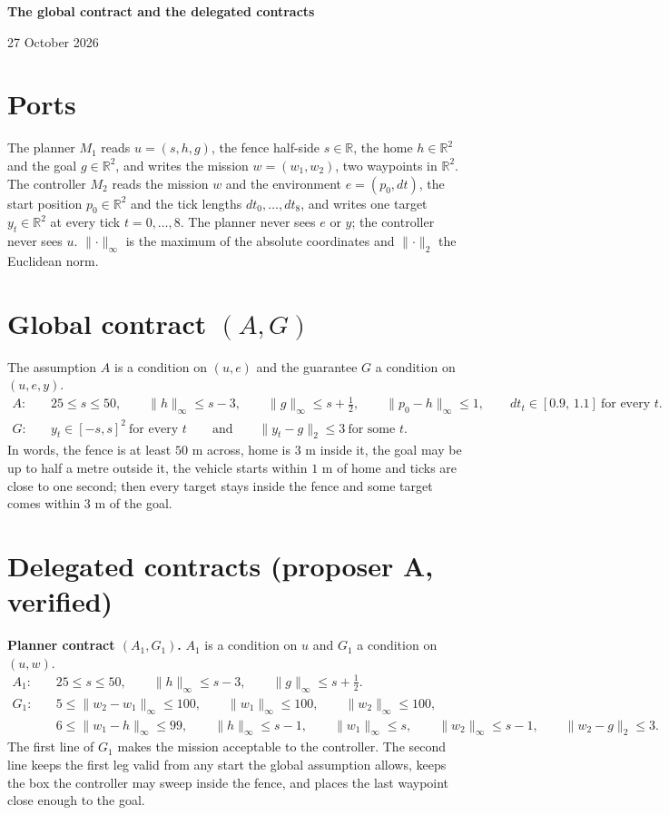 \documentclass[10pt]{article}
\newcommand{\ninf}[1]{\lVert #1\rVert_\infty}
\newcommand{\ntwo}[1]{\lVert #1\rVert_2}
\begin{document}
{\Large\bfseries The global contract and the delegated contracts}\par 27 October 2026

\section*{Ports}
The planner $M_1$ reads $u=(s,h,g)$, the fence half-side $s\in\mathbb R$, the home $h\in\mathbb R^2$ and the goal $g\in\mathbb R^2$, and writes the mission $w=(w_1,w_2)$, two waypoints in $\mathbb R^2$. The controller $M_2$ reads the mission $w$ and the environment $e=(p_0,dt)$, the start position $p_0\in\mathbb R^2$ and the tick lengths $dt_0,\dots,dt_8$, and writes one target $y_t\in\mathbb R^2$ at every tick $t=0,\dots,8$. The planner never sees $e$ or $y$; the controller never sees $u$. $\ninf{\cdot}$ is the maximum of the absolute coordinates and $\ntwo{\cdot}$ the Euclidean norm.

\section*{Global contract $(A,G)$}
The assumption $A$ is a condition on $(u,e)$ and the guarantee $G$ a condition on $(u,e,y)$.
\begin{align*}
A:\quad& 25\le s\le 50,\qquad \ninf{h}\le s-3,\qquad \ninf{g}\le s+\tfrac12,\qquad \ninf{p_0-h}\le 1,\qquad dt_t\in[0.9,\,1.1]\ \text{for every } t.\\
G:\quad& y_t\in[-s,s]^2\ \text{for every } t\qquad\text{and}\qquad \ntwo{y_t-g}\le 3\ \text{for some } t.
\end{align*}
In words, the fence is at least $50$ m across, home is $3$ m inside it, the goal may be up to half a metre outside it, the vehicle starts within $1$ m of home and ticks are close to one second; then every target stays inside the fence and some target comes within $3$ m of the goal.

\section*{Delegated contracts (proposer A, verified)}
\textbf{Planner contract $(A_1,G_1)$.} $A_1$ is a condition on $u$ and $G_1$ a condition on $(u,w)$.
\begin{align*}
A_1:\quad& 25\le s\le 50,\qquad \ninf{h}\le s-3,\qquad \ninf{g}\le s+\tfrac12.\\
G_1:\quad& 5\le\ninf{w_2-w_1}\le 100,\qquad \ninf{w_1}\le 100,\qquad \ninf{w_2}\le 100,\\
& 6\le\ninf{w_1-h}\le 99,\qquad \ninf{h}\le s-1,\qquad \ninf{w_1}\le s,\qquad \ninf{w_2}\le s-1,\qquad \ntwo{w_2-g}\le 3 .
\end{align*}
The first line of $G_1$ makes the mission acceptable to the controller. The second line keeps the first leg valid from any start the global assumption allows, keeps the box the controller may sweep inside the fence, and places the last waypoint close enough to the goal.
\end{document}
